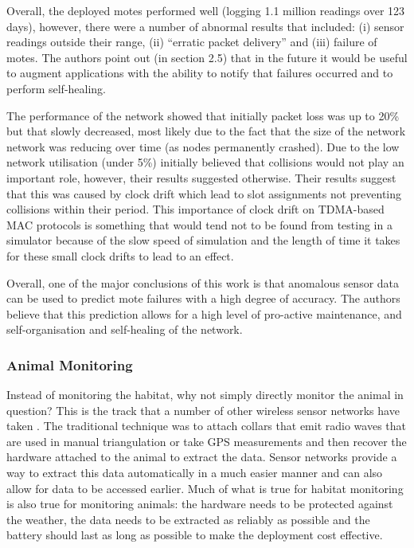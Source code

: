 Overall, the deployed motes performed well (logging 1.1 million readings over 123 days), however, there were a number of abnormal results that included: (i) sensor readings outside their range, (ii) ``erratic packet delivery'' and (iii) failure of motes. The authors point out (in section 2.5) that in the future it would be useful to augment applications with the ability to notify that failures occurred and to perform self-healing.

The performance of the network showed that initially packet loss was up to 20\% but that slowly decreased, most likely due to the fact that the size of the network network was reducing over time (as nodes permanently crashed). Due to the low network utilisation (under 5\%) \citeauthor{SzewczykPMC04} initially believed that collisions would not play an important role, however, their results suggested otherwise. Their results suggest that this was caused by clock drift which lead to slot assignments not preventing collisions within their period. This importance of clock drift on TDMA-based MAC protocols is something that would tend not to be found from testing in a simulator because of the slow speed of simulation and the length of time it takes for these small clock drifts to lead to an effect.

Overall, one of the major conclusions of this work is that anomalous sensor data can be used to predict mote failures with a high degree of accuracy. The authors believe that this prediction allows for a high level of pro-active maintenance, and self-organisation and self-healing of the network.

\subsubsection*{Animal Monitoring}

Instead of monitoring the habitat, why not simply directly monitor the animal in question? This is the track that a number of other wireless sensor networks have taken \cite{Juang:2002:ECW:635508.605408}. The traditional technique was to attach collars that emit radio waves that are used in manual triangulation or take GPS measurements and then recover the hardware attached to the animal to extract the data. Sensor networks provide a way to extract this data automatically in a much easier manner and can also allow for data to be accessed earlier.   Much of what is true for habitat monitoring is also true for monitoring animals: the hardware needs to be protected against the weather, the data needs to be extracted as reliably as possible and the battery should last as long as possible to make the deployment cost effective.

